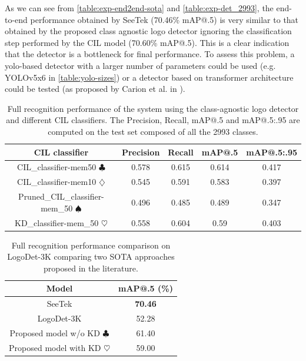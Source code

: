 As we can see from \autoref{table:exp-end2end-sota} and \autoref{table:exp-det_2993}, the end-to-end performance obtained by SeeTek (70.46\% mAP@.5) is very similar to that obtained by the proposed class agnostic logo detector ignoring the classification step performed by the CIL model (70.60\% mAP@.5). This is a clear indication that the detector is a bottleneck for final performance. To assess this problem, a yolo-based detector with a larger number of parameters could be used (e.g. YOLOv5x6 in \autoref{table:yolo-sizes}) or a detector based on transformer architecture could be tested (as proposed by Carion et al. in \cite{carion2020end}).

\begin{table}[H]
    \centering
    \begin{tabular}{c|c|c|c|c}
        \hline
        \textbf{CIL classifier} &
        \textbf{Precision} &
        \textbf{Recall} &
        \textbf{mAP@.5} &
        \textbf{mAP@.5:.95} \\
        \hline
        \hline
CIL\_classifier-mem50 $\clubsuit$&0.578&0.615&0.614&0.417\\
CIL\_classifier-mem10 $\diamondsuit$&0.545&0.591&0.583&0.397\\
Pruned\_CIL\_classifier-mem\_50 $\spadesuit$&0.496&0.485&0.489&0.347\\
KD\_classifier-mem\_50 $\heartsuit$&0.558&0.604&0.59&0.403\\
\hline
\end{tabular}
\caption{Full recognition performance of the system using the class-agnostic logo detector and different CIL classifiers. The Precision, Recall, mAP@.5 and mAP@.5:.95 are computed on the test set composed of all the 2993 classes.}
    \label{table:exp-end2end}
\end{table}


\begin{table}[H]
    \centering
    \begin{tabular}{c|c}
        \hline
        \textbf{Model} &
        \textbf{mAP@.5 (\%)}\\
        \hline
        \hline
SeeTek \cite{li2022seetek}&\textbf{70.46}\\
LogoDet-3K \cite{wang2022logodet}&52.28\\
\hline
Proposed model w/o KD $\clubsuit$&61.40\\
Proposed model with KD $\heartsuit$&59.00\\
\hline
\end{tabular}
\caption{Full recognition performance comparison on LogoDet-3K comparing two SOTA approaches proposed in the literature.}
    \label{table:exp-end2end-sota}
\end{table}

